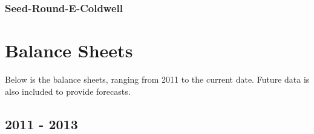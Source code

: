 \documentclass[letterpaper,10pt,openany,oneside,english]{sphinxmanual}
\begin{document}
\subsection{Seed-Round-E-Coldwell}
\label{\detokenize{statements:seed-round-e-coldwell}}

\chapter{Balance Sheets}
\label{\detokenize{balancesheet2:balance-sheets}}\label{\detokenize{balancesheet2::doc}}
Below is the balance sheets, ranging from 2011 to the current date. Future data is also included to provide forecasts.


\section{2011 - 2013}
\label{\detokenize{balancesheet2:id1}}
\end{document}
